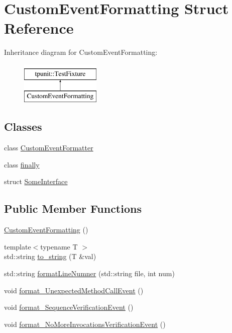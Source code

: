 \hypertarget{structCustomEventFormatting}{}\section{Custom\+Event\+Formatting Struct Reference}
\label{structCustomEventFormatting}
Inheritance diagram for Custom\+Event\+Formatting\+:\begin{figure}[H]
\begin{center}
\leavevmode
\includegraphics[height=2.000000cm]{structCustomEventFormatting}
\end{center}
\end{figure}
\subsection*{Classes}
\begin{DoxyCompactItemize}
\item 
class \mbox{\hyperlink{classCustomEventFormatting_1_1CustomEventFormatter}{Custom\+Event\+Formatter}}
\item 
class \mbox{\hyperlink{classCustomEventFormatting_1_1finally}{finally}}
\item 
struct \mbox{\hyperlink{structCustomEventFormatting_1_1SomeInterface}{Some\+Interface}}
\end{DoxyCompactItemize}
\subsection*{Public Member Functions}
\begin{DoxyCompactItemize}
\item 
\mbox{\hyperlink{structCustomEventFormatting_a390808ddc7445b07d09e5bc751439006}{Custom\+Event\+Formatting}} ()
\item 
{\footnotesize template$<$typename T $>$ }\\std\+::string \mbox{\hyperlink{structCustomEventFormatting_ab3e7573bccfb45e91fe3da4d5ab5953e}{to\+\_\+string}} (T \&val)
\item 
std\+::string \mbox{\hyperlink{structCustomEventFormatting_ad9228721b5c25a5856b40bc664bc1bf7}{format\+Line\+Numner}} (std\+::string file, int num)
\item 
void \mbox{\hyperlink{structCustomEventFormatting_a6e357b2a7cde44c4bf81950994c7c484}{format\+\_\+\+Unexpected\+Method\+Call\+Event}} ()
\item 
void \mbox{\hyperlink{structCustomEventFormatting_ab675a3fa7d26ea7c289589024a0c641b}{format\+\_\+\+Sequence\+Verification\+Event}} ()
\item 
void \mbox{\hyperlink{structCustomEventFormatting_a70972af16c2e76b7a108ee6389a3fef8}{format\+\_\+\+No\+More\+Invocations\+Verification\+Event}} ()
\end{DoxyCompactItemize}

